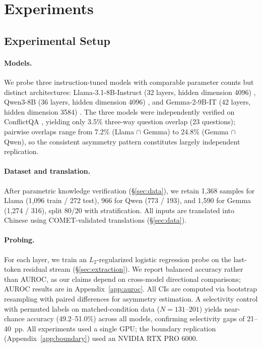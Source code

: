 \section{Experiments}
\label{sec:experiments}

\subsection{Experimental Setup}
\label{sec:setup}

\paragraph{Models.}
We probe three instruction-tuned models with comparable parameter counts but distinct architectures: Llama-3.1-8B-Instruct (32 layers, hidden dimension 4096) \citep{grattafiori2024llama}, Qwen3-8B (36 layers, hidden dimension 4096) \citep{yang2025qwen3}, and Gemma-2-9B-IT (42 layers, hidden dimension 3584) \citep{team2024gemma}.
The three models were independently verified on ConflictQA \citep{xie2024adaptive}, yielding only 3.5\% three-way question overlap (23 questions); pairwise overlaps range from 7.2\% (Llama $\cap$ Gemma) to 24.8\% (Gemma $\cap$ Qwen), so the consistent asymmetry pattern constitutes largely independent replication.

\paragraph{Dataset and translation.}
After parametric knowledge verification (\S\ref{sec:data}), we retain 1{,}368 samples for Llama (1{,}096 train / 272 test), 966 for Qwen (773 / 193), and 1{,}590 for Gemma (1{,}274 / 316), split 80/20 with stratification.
All inputs are translated into Chinese using COMET-validated translations (\S\ref{sec:data}).

\paragraph{Probing.}
For each layer, we train an $L_2$-regularized logistic regression probe on the last-token residual stream (\S\ref{sec:extraction}).
We report balanced accuracy rather than AUROC, as our claims depend on cross-model directional comparisons; AUROC results are in Appendix~\ref{app:auroc}.
All CIs are computed via bootstrap resampling with paired differences for asymmetry estimation.
A selectivity control \citep{hewitt2019designing} with permuted labels on matched-condition data ($N{=}131$--$201$) yields near-chance accuracy (49.2--51.0\%) across all models, confirming selectivity gaps of 21--40~pp.
All experiments used a single GPU; the boundary replication (Appendix~\ref{app:boundary}) used an NVIDIA RTX PRO 6000.

